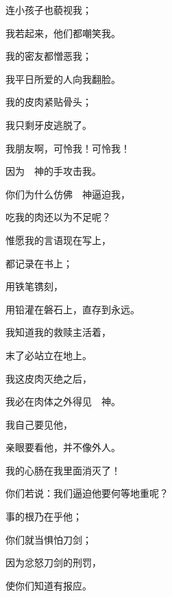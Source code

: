 {\par }{\Q {}连小孩子也藐视我；
\par }{\Q 我若起来，他们都嘲笑我。
\par }{\Q {}我的密友都憎恶我；
\par }{\Q 我平日所爱的人向我翻脸。
\par }{\Q {}我的皮肉紧贴骨头；
\par }{\Q 我只剩牙皮逃脱了。
\par }{\Q {}我朋友啊，可怜我！可怜我！
\par }{\Q 因为　神的手攻击我。
\par }{\Q {}你们为什么仿佛　神逼迫我，
\par }{\Q 吃我的肉还以为不足呢？
\par }{\BB \par }{\Q {}惟愿我的言语现在写上，
\par }{\Q 都记录在书上；
\par }{\Q {}用铁笔镌刻，
\par }{\Q 用铅灌在磐石上，直存到永远。
\par }{\Q {}我知道我的救赎主活着，
\par }{\Q 末了必站立在地上。
\par }{\Q {}我这皮肉灭绝之后，
\par }{\Q 我必在肉体之外得见　神。
\par }{\Q {}我自己要见他，
\par }{\Q 亲眼要看他，并不像外人。
\par }{\Q 我的心肠在我里面消灭了！
\par }{\Q {}你们若说：我们逼迫他要何等地重呢？
\par }{事的根乃在乎他；
\par }{\Q {}你们就当惧怕刀剑；
\par }{\Q 因为忿怒{}刀剑的刑罚，
\par }{\Q 使你们知道有报应。

}
